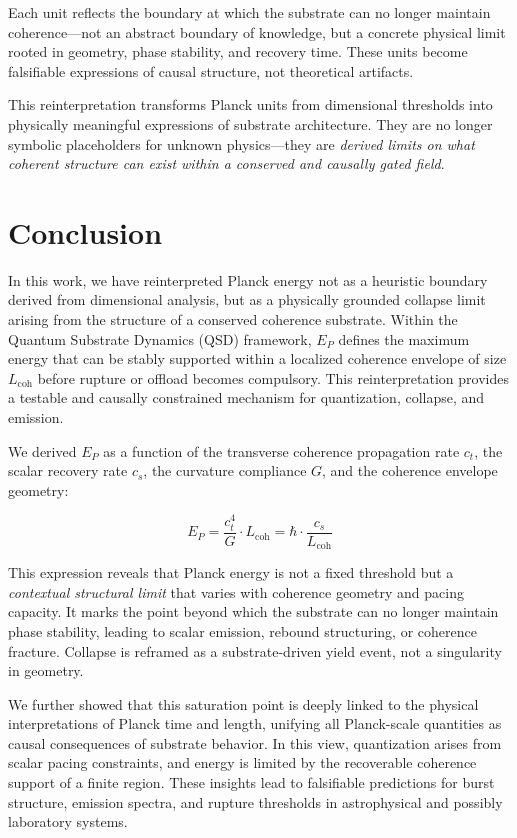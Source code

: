 \documentclass[entropy,article,submit,pdftex,moreauthors]{Definitions/mdpi}
\begin{document}
Each unit reflects the boundary at which the substrate can no longer maintain coherence---not an abstract boundary of knowledge, but a concrete physical limit rooted in geometry, phase stability, and recovery time. These units become falsifiable expressions of causal structure, not theoretical artifacts.

This reinterpretation transforms Planck units from dimensional thresholds into physically meaningful expressions of substrate architecture. They are no longer symbolic placeholders for unknown physics—they are \textit{derived limits on what coherent structure can exist within a conserved and causally gated field}.


\section{Conclusion}

In this work, we have reinterpreted Planck energy not as a heuristic boundary derived from dimensional analysis, but as a physically grounded collapse limit arising from the structure of a conserved coherence substrate. Within the Quantum Substrate Dynamics (QSD) framework, $E_P$ defines the maximum energy that can be stably supported within a localized coherence envelope of size $L_{\text{coh}}$ before rupture or offload becomes compulsory. This reinterpretation provides a testable and causally constrained mechanism for quantization, collapse, and emission.

We derived $E_P$ as a function of the transverse coherence propagation rate $c_t$, the scalar recovery rate $c_s$, the curvature compliance $G$, and the coherence envelope geometry:

\begin{equation}
E_P = \frac{c_t^4}{G} \cdot L_{\text{coh}} = \hbar \cdot \frac{c_s}{L_{\text{coh}}}
\end{equation}

This expression reveals that Planck energy is not a fixed threshold but a \textit{contextual structural limit} that varies with coherence geometry and pacing capacity. It marks the point beyond which the substrate can no longer maintain phase stability, leading to scalar emission, rebound structuring, or coherence fracture. Collapse is reframed as a substrate-driven yield event, not a singularity in geometry.

We further showed that this saturation point is deeply linked to the physical interpretations of Planck time and length, unifying all Planck-scale quantities as causal consequences of substrate behavior. In this view, quantization arises from scalar pacing constraints, and energy is limited by the recoverable coherence support of a finite region. These insights lead to falsifiable predictions for burst structure, emission spectra, and rupture thresholds in astrophysical and possibly laboratory systems.
\end{document}
